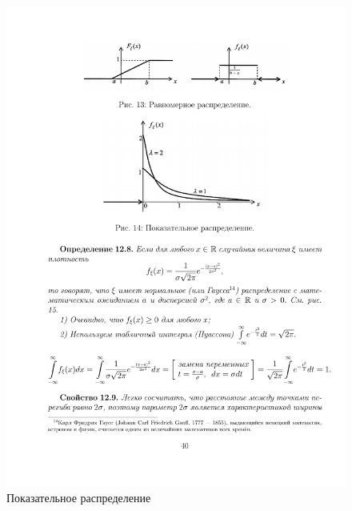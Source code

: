 \begin{figure}[H]
	\centering
	\includegraphics[]{pic/pic14}
	\caption{Показательное распределение}
	\label{fig14}
\end{figure}

